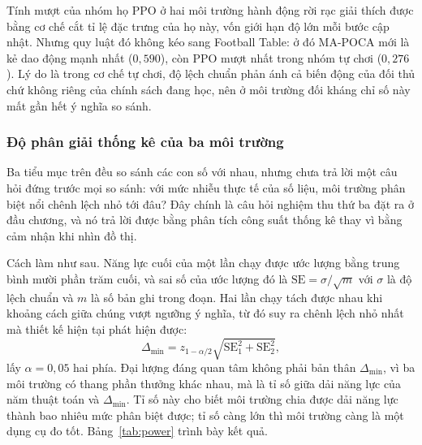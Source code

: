 \indent Tính mượt của nhóm họ PPO ở hai môi trường hành động rời rạc giải thích được bằng
cơ chế cắt tỉ lệ đặc trưng của họ này, vốn giới hạn độ lớn mỗi bước cập nhật. Nhưng quy
luật đó không kéo sang Football Table: ở đó MA-POCA mới là kẻ dao động mạnh nhất
($0{,}590$), còn PPO mượt nhất trong nhóm tự chơi ($0{,}276$). Lý do là trong cơ chế tự
chơi, độ lệch chuẩn phản ánh cả biến động của đối thủ chứ không riêng của chính sách đang
học, nên ở môi trường đối kháng chỉ số này mất gần hết ý nghĩa so sánh.

\subsubsection{Độ phân giải thống kê của ba môi trường}
\label{sub:power}
\indent Ba tiểu mục trên đều so sánh các con số với nhau, nhưng chưa trả lời một câu hỏi
đứng trước mọi so sánh: với mức nhiễu thực tế của số liệu, môi trường phân biệt nổi chênh
lệch nhỏ tới đâu? Đây chính là câu hỏi nghiệm thu thứ ba đặt ra ở đầu chương, và nó trả lời
được bằng phân tích công suất thống kê thay vì bằng cảm nhận khi nhìn đồ thị.

\indent Cách làm như sau. Năng lực cuối của một lần chạy được ước lượng bằng trung bình mười
phần trăm cuối, và sai số của ước lượng đó là $\mathrm{SE} = \sigma/\sqrt{m}$ với $\sigma$ là
độ lệch chuẩn và $m$ là số bản ghi trong đoạn. Hai lần chạy tách được nhau khi khoảng cách
giữa chúng vượt ngưỡng ý nghĩa, từ đó suy ra chênh lệch nhỏ nhất mà thiết kế hiện tại phát
hiện được:
\begin{equation}
\Delta_{\min} = z_{1-\alpha/2}\sqrt{\mathrm{SE}_{1}^{2} + \mathrm{SE}_{2}^{2}} ,
\label{eq:mde}
\end{equation}
lấy $\alpha = 0{,}05$ hai phía. Đại lượng đáng quan tâm không phải bản thân $\Delta_{\min}$,
vì ba môi trường có thang phần thưởng khác nhau, mà là tỉ số giữa dải năng lực của năm thuật
toán và $\Delta_{\min}$. Tỉ số này cho biết môi trường chia được dải năng lực thành bao nhiêu
mức phân biệt được; tỉ số càng lớn thì môi trường càng là một dụng cụ đo tốt.
Bảng~\ref{tab:power} trình bày kết quả.

